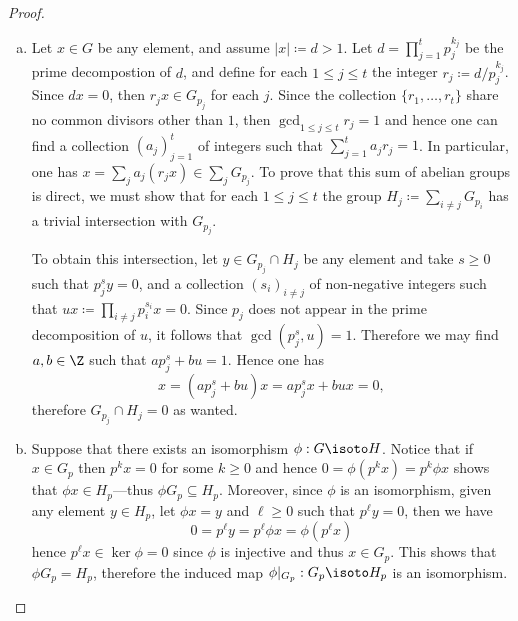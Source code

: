 \begin{proof}
    \begin{enumerate}[(a)]\setlength\itemsep{0em}
        \item Let \(x \in G\) be any element, and assume \(|x| \coloneq d > 1\). Let
              \(d = \prod_{j=1}^t p_j^{k_j}\) be the prime decompostion of \(d\), and define
              for each \(1 \leq j \leq t\) the integer \(r_j \coloneq d/p_j^{k_j}\). Since
              \(d x = 0\), then \(r_j x \in G_{p_j}\) for each \(j\). Since the collection
              \(\{r_1, \dots, r_t\}\) share no common divisors other than \(1\), then
              \(\gcd_{1 \leq j \leq t} r_j = 1\) and hence one can find a collection
              \((a_j)_{j=1}^t\) of integers such that \(\sum_{j=1}^t a_j r_j = 1\). In
              particular, one has \(x = \sum_j a_j (r_j x) \in \sum_j G_{p_j}\). To prove
              that this sum of abelian groups is direct, we must show that for each
              \(1 \leq j \leq t\) the group \(H_j \coloneq \sum_{i \neq j} G_{p_i}\) has a
              trivial intersection with \(G_{p_j}\).

              To obtain this intersection, let \(y \in G_{p_j} \cap H_j\) be any element and
              take \(s \geq 0\) such that \(p_j^s y = 0\), and a collection
              \((s_i)_{i \neq j}\) of non-negative integers such that
              \(u x \coloneq \prod_{i \neq j} p_i^{s_i} x = 0\). Since \(p_j\) does not
              appear in the prime decomposition of \(u\), it follows that
              \(\gcd(p_j^s, u) = 1\). Therefore we may find \(a, b \in \Z\) such that
              \(a p_j^s + b u = 1\). Hence one has
              \[
                  x = (a p_j^s + b u) x = a p_j^s x + b u x = 0,
              \]
              therefore \(G_{p_j} \cap H_j = 0\) as wanted.

        \item Suppose that there exists an isomorphism \(\phi: G \isoto H\). Notice that
              if \(x \in G_p\) then \(p^k x = 0\) for some \(k \geq 0\) and hence
              \(0 = \phi(p^k x) = p^k \phi x\) shows that \(\phi x \in H_p\)---thus \(\phi
              G_p \subseteq H_p\). Moreover, since \(\phi\) is an isomorphism, given any
              element \(y \in H_p\), let \(\phi x = y\) and \(\ell \geq 0\) such that
              \(p^{\ell} y = 0\), then we have
              \[
                  0 = p^{\ell} y = p^{\ell} \phi x = \phi(p^{\ell} x)
              \]
              hence \(p^{\ell} x \in \ker \phi = 0\) since \(\phi\) is injective and thus
              \(x \in G_p\). This shows that \(\phi G_p = H_p\), therefore the induced map
              \(\phi|_{G_p}: G_p \isoto H_p\) is an isomorphism.


\end{enumerate}
\end{proof}
